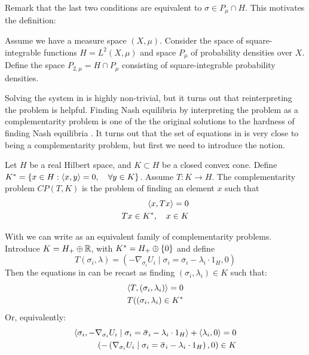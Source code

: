 Remark that the last two conditions are equivalent to $\sigma \in P_{\mu} \cap H$. This motivates the definition:
\begin{definition}
  Assume we have a measure space $(X,\mu)$. Consider the space of square-integrable functions $H=L^2(X,\mu)$ and space $P_{\mu}$ of probability densities over $X$. Define the space $P_{2,\mu}=H \cap P_{\mu}$ consisting of square-integrable probability densities.
\end{definition}
Solving the system in  is highly non-trivial, but it turns out that reinterpreting the problem is helpful.
Finding Nash equilibria by interpreting the problem as a complementarity problem is one of the the original solutions to the hardness of finding Nash equilibria  \citep{karamardian1969nonlinear}. It turns out that the set of equations in  is very close to being a complementarity problem, but first we need to introduce the notion.
\begin{definition}
  \label{def:comp_prob}
  Let $H$ be a real Hilbert space, and $K \subset H$ be a closed convex cone. Define $K^* = \{ x \in H : \left \langle x,y \right \rangle = 0, \quad \forall y\in K\} $. Assume $T:K \to H$. The complementarity problem $CP(T,K)$ is the problem of finding an element $x$ such that
  \begin{equation}
    \begin{split}
    \left \langle x,Tx \right \rangle = 0 \\
    Tx \in K^*, \quad  x\in K
  \end{split}
  \end{equation}
\end{definition}
With  we can write  as an equivalent family of complementarity problems. Introduce $K = H_+ \oplus \mathbb{R}$, with $K^* = H_+ \oplus \{0\}$ and define
\begin{equation}
  T(\sigma_i, \lambda) = (-\nabla_{\sigma_i} U_i \mid{\sigma_i = \overbar{\sigma}_i} - \lambda_i \cdot 1_H, 0)
\end{equation}
Then the equations in  can be recast as finding $(\sigma_i,\lambda_i) \in K$ such that:
\begin{equation}
  \label{eq:comp_form}
  \begin{split}
    \left \langle T,(\sigma_i,\lambda_i) \right \rangle = 0 \\
    T((\sigma_i,\lambda_i) \in K^*
  \end{split}
\end{equation}
Or, equivalently:
\begin{equation}
  \begin{split}
    \ip{\sigma_i}{-\nabla_{\sigma_i} U_i \mid{\sigma_i = \overbar{\sigma}_i} - \lambda_i \cdot 1_H} + \ip{\lambda_i}{0}= 0 \\
    \pa{-\pa{\nabla_{\sigma_i} U_i \mid{\sigma_i = \overbar{\sigma}_i} - \lambda_i \cdot 1_H}, 0} \in K
  \end{split}
\end{equation}
